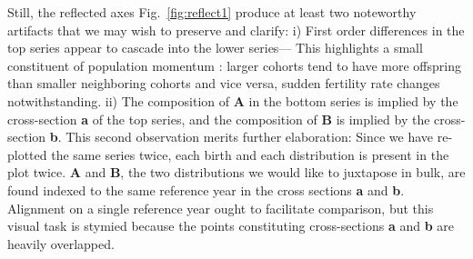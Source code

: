 \documentclass{article}
\begin{document}
Still, the reflected axes Fig.~\ref{fig:reflect1} produce at least two noteworthy artifacts that we may wish to preserve and clarify: i) First order differences in the top series appear to cascade into the lower series--- This highlights a small constituent of population momentum \citep{keyfitz1971momentum}: larger cohorts tend to have more offspring than smaller neighboring cohorts and vice versa, sudden fertility rate changes notwithstanding. ii) The composition of \textbf{A} in the bottom series is implied by the cross-section \textbf{a} of the top series, and the composition of \textbf{B} is implied by the cross-section \textbf{b}. This second observation merits further elaboration: Since we have re-plotted the same series twice, each birth and each distribution is present in the plot twice. \textbf{A} and \textbf{B}, the two distributions we would like to juxtapose in bulk, are found indexed to the same reference year in the cross sections \textbf{a} and \textbf{b}. Alignment on a single reference year ought to facilitate comparison, but this visual task is stymied because the points constituting cross-sections \textbf{a} and \textbf{b} are heavily overlapped. 
\end{document}
